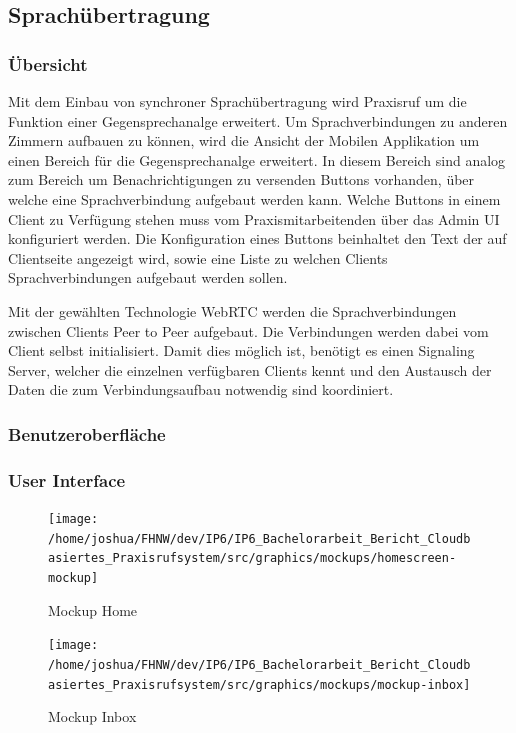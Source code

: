 \subsection{Sprachübertragung}

\subsubsection*{Übersicht}

Mit dem Einbau von synchroner Sprachübertragung wird Praxisruf um die Funktion einer Gegensprechanalge erweitert.
Um Sprachverbindungen zu anderen Zimmern aufbauen zu können, wird die Ansicht der Mobilen Applikation um einen
Bereich für die Gegensprechanalge erweitert.
In diesem Bereich sind analog zum Bereich um Benachrichtigungen zu versenden Buttons vorhanden, über welche eine
Sprachverbindung aufgebaut werden kann.
Welche Buttons in einem Client zu Verfügung stehen muss vom Praxismitarbeitenden über das Admin UI konfiguriert werden.
Die Konfiguration eines Buttons beinhaltet den Text der auf Clientseite angezeigt wird, sowie eine Liste zu welchen
Clients Sprachverbindungen aufgebaut werden sollen.

Mit der gewählten Technologie WebRTC werden die Sprachverbindungen zwischen Clients Peer to Peer aufgebaut.
Die Verbindungen werden dabei vom Client selbst initialisiert.
Damit dies möglich ist, benötigt es einen Signaling Server, welcher die einzelnen verfügbaren Clients kennt und
den Austausch der Daten die zum Verbindungsaufbau notwendig sind koordiniert.

\subsubsection*{Benutzeroberfläche}

\subsubsection{User Interface}
\begin{figure}[h]
    \centering
    \begin{minipage}[b]{0.4\textwidth}
        \texttt{[image: /home/joshua/FHNW/dev/IP6/IP6\_Bachelorarbeit\_Bericht\_Cloudbasiertes\_Praxisrufsystem/src/graphics/mockups/homescreen-mockup]}
        \caption{Mockup Home}
    \end{minipage}
    \hfill
    \begin{minipage}[b]{0.4\textwidth}
        \texttt{[image: /home/joshua/FHNW/dev/IP6/IP6\_Bachelorarbeit\_Bericht\_Cloudbasiertes\_Praxisrufsystem/src/graphics/mockups/mockup-inbox]}
        \caption{Mockup Inbox}
    \end{minipage}\label{fig:HomeScreen-And-Inbox-Mock}
\end{figure}

